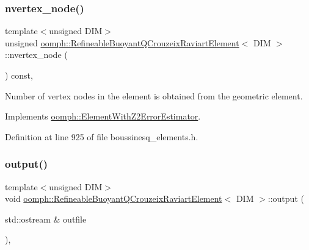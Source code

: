\subsubsection{\texorpdfstring{nvertex\+\_\+node()}{nvertex\_node()}}
{\footnotesize\ttfamily template$<$unsigned D\+IM$>$ \\
unsigned \hyperlink{classoomph_1_1RefineableBuoyantQCrouzeixRaviartElement}{oomph\+::\+Refineable\+Buoyant\+Q\+Crouzeix\+Raviart\+Element}$<$ D\+IM $>$\+::nvertex\+\_\+node (\begin{DoxyParamCaption}{ }\end{DoxyParamCaption}) const\hspace{0.3cm}{\ttfamily [inline]}, {\ttfamily [virtual]}}



Number of vertex nodes in the element is obtained from the geometric element. 



Implements \hyperlink{classoomph_1_1ElementWithZ2ErrorEstimator_a19495a0e77ef4ff35f15fdf7913b4077}{oomph\+::\+Element\+With\+Z2\+Error\+Estimator}.



Definition at line 925 of file boussinesq\+\_\+elements.\+h.

\mbox{\label{classoomph_1_1RefineableBuoyantQCrouzeixRaviartElement_abbe05b977edbfec7752ed417b90e09fa}} 
\subsubsection{\texorpdfstring{output()}{output()}\hspace{0.1cm}{\footnotesize\ttfamily [1/4]}}
{\footnotesize\ttfamily template$<$unsigned D\+IM$>$ \\
void \hyperlink{classoomph_1_1RefineableBuoyantQCrouzeixRaviartElement}{oomph\+::\+Refineable\+Buoyant\+Q\+Crouzeix\+Raviart\+Element}$<$ D\+IM $>$\+::output (\begin{DoxyParamCaption}\item[{std\+::ostream \&}]{outfile }\end{DoxyParamCaption})\hspace{0.3cm}{\ttfamily [inline]}, {\ttfamily [virtual]}}



